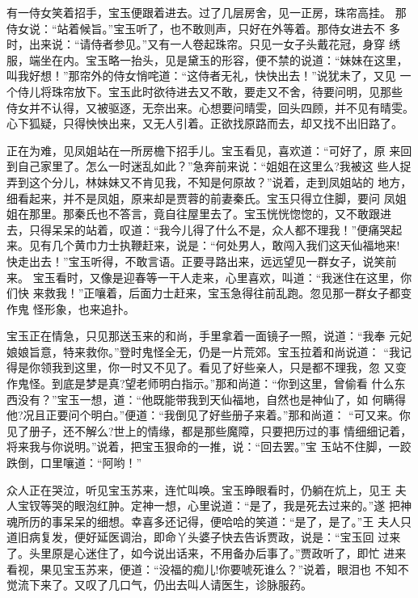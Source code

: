 有一侍女笑着招手，宝玉便跟着进去。过了几层房舍，见一正房，珠帘高挂。
那侍女说：“站着候旨。”宝玉听了，也不敢则声，只好在外等着。那侍女进去不
多时，出来说：“请侍者参见。”又有一人卷起珠帘。只见一女子头戴花冠，身穿
绣服，端坐在内。宝玉略一抬头，见是黛玉的形容，便不禁的说道：“妹妹在这里，
叫我好想！”那帘外的侍女悄咤道：“这侍者无礼，快快出去！”说犹未了，又见
一个侍儿将珠帘放下。宝玉此时欲待进去又不敢，要走又不舍，待要问明，见那些
侍女并不认得，又被驱逐，无奈出来。心想要问晴雯，回头四顾，并不见有晴雯。
心下狐疑，只得怏怏出来，又无人引着。正欲找原路而去，却又找不出旧路了。

正在为难，见凤姐站在一所房檐下招手儿。宝玉看见，喜欢道：“可好了，原
来回到自己家里了。怎么一时迷乱如此？”急奔前来说：“姐姐在这里么?我被这
些人捉弄到这个分儿，林妹妹又不肯见我，不知是何原故？”说着，走到凤姐站的
地方，细看起来，并不是凤姐，原来却是贾蓉的前妻秦氏。宝玉只得立住脚，要问
凤姐姐在那里。那秦氏也不答言，竟自往屋里去了。宝玉恍恍惚惚的，又不敢跟进
去，只得呆呆的站着，叹道：“我今儿得了什么不是，众人都不理我！”便痛哭起
来。见有几个黄巾力士执鞭赶来，说是：“何处男人，敢闯入我们这天仙福地来!
快走出去！”宝玉听得，不敢言语。正要寻路出来，远远望见一群女子，说笑前来。
宝玉看时，又像是迎春等一干人走来，心里喜欢，叫道：“我迷住在这里，你们快
来救我！”正嚷着，后面力士赶来，宝玉急得往前乱跑。忽见那一群女子都变作鬼
怪形象，也来追扑。

宝玉正在情急，只见那送玉来的和尚，手里拿着一面镜子一照，说道：“我奉
元妃娘娘旨意，特来救你。”登时鬼怪全无，仍是一片荒郊。宝玉拉着和尚说道：
“我记得是你领我到这里，你一时又不见了。看见了好些亲人，只是都不理我，忽
又变作鬼怪。到底是梦是真?望老师明白指示。”那和尚道：“你到这里，曾偷看
什么东西没有？”宝玉一想，道：“他既能带我到天仙福地，自然也是神仙了，如
何瞒得他?况且正要问个明白。”便道：“我倒见了好些册子来着。”那和尚道：
“可又来。你见了册子，还不解么?世上的情缘，都是那些魔障，只要把历过的事
情细细记着，将来我与你说明。”说着，把宝玉狠命的一推，说：“回去罢。”宝
玉站不住脚，一跤跌倒，口里嚷道：“阿哟！”

众人正在哭泣，听见宝玉苏来，连忙叫唤。宝玉睁眼看时，仍躺在炕上，见王
夫人宝钗等哭的眼泡红肿。定神一想，心里说道：“是了，我是死去过来的。”遂
把神魂所历的事呆呆的细想。幸喜多还记得，便哈哈的笑道：“是了，是了。”王
夫人只道旧病复发，便好延医调治，即命丫头婆子快去告诉贾政，说是：“宝玉回
过来了。头里原是心迷住了，如今说出话来，不用备办后事了。”贾政听了，即忙
进来看视，果见宝玉苏来，便道：“没福的痴儿!你要唬死谁么？”说着，眼泪也
不知不觉流下来了。又叹了几口气，仍出去叫人请医生，诊脉服药。

